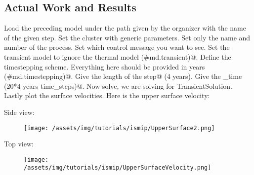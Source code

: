 \subsection{Actual Work and Results} %
Load the preceding model under the path given by the organizer with the name of the given step. Set the cluster with generic parameters. Set only the name and number of the process. Set which control message you want to see. Set the transient model to ignore the thermal model \verb@(#md.transient)@. Define the timestepping scheme. Everything here should be provided in years \verb@(#md.timestepping)@. Give the length of the \verb@time step@ (4 years). Give the \verb@final_time (20*4 years time_steps)@. Now solve, we are solving for TransientSolution. Lastly plot the surface velocities. Here is the upper surface velocity:

Side view:
\begin{figure}[H]
	\begin{center}
		\texttt{[image: /assets/img/tutorials/ismip/UpperSurface2.png]}
	\end{center}
\end{figure}
Top view:
\begin{figure}[H]
	\begin{center}
		\texttt{[image: /assets/img/tutorials/ismip/UpperSurfaceVelocity.png]}
	\end{center}
\end{figure}
